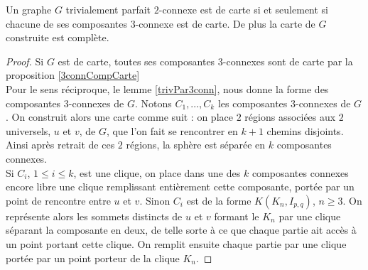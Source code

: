 \documentclass{scrartcl}
\begin{document}
\begin{flushleft}
\begin{theorem}\label{maptrivperf}
    Un graphe $G$ trivialement parfait $2$-connexe est de carte si et seulement si chacune de ses composantes $3$-connexe est de carte.
    De plus la carte de $G$ construite est complète.
\end{theorem}

\begin{proof}
    Si $G$ est de carte, toutes ses composantes $3$-connexes sont de carte par la proposition \ref{3connCompCarte}\\
    Pour le sens réciproque, le lemme \ref{trivPar3conn}, nous donne la forme des composantes $3$-connexes de $G$.
    Notons $C_1, ..., C_k$ les composantes $3$-connexes de $G$. On construit alors une carte comme suit :
    on place $2$ régions associées aux $2$ universels, $u$ et $v$, de $G$, que l'on fait se rencontrer en $k+1$ chemins disjoints.
    Ainsi après retrait de ces $2$ régions, la sphère est séparée en $k$ composantes connexes.\\
    Si $C_i$, $1 \leq i \leq k$, est une clique, on place dans une des $k$ composantes connexes encore libre une clique
    remplissant entièrement cette composante, portée par un point de rencontre entre $u$ et $v$. Sinon $C_i$ est
    de la forme $K(K_n, I_{p,q})$, $n \geq 3$. On représente alors les sommets distincts de $u$ et $v$ formant le $K_n$
    par une clique séparant la composante en deux, de telle sorte à ce que chaque partie ait accès à un point portant
    cette clique. On remplit ensuite chaque partie par une clique portée par un point porteur de la clique $K_n$.
\end{proof}


\end{flushleft}
\end{document}
